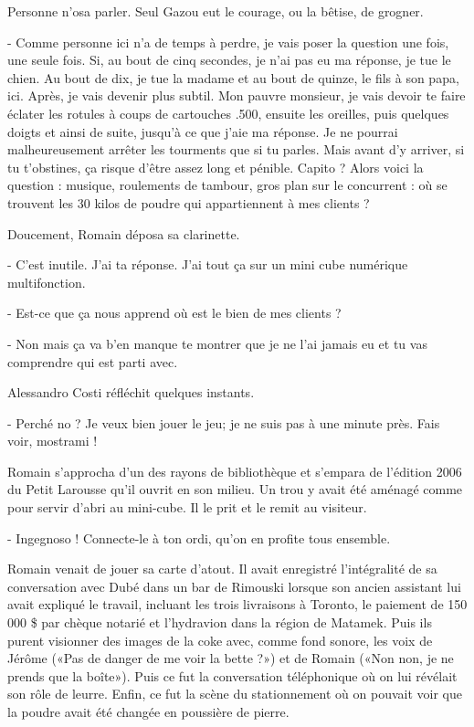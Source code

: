 Personne n’osa parler. Seul Gazou eut le courage, ou la bêtise, de grogner.

- Comme personne ici n’a de temps à perdre, je vais poser la question une fois, une seule fois. Si, au bout de cinq secondes, je n’ai pas eu ma réponse, je tue le chien. Au bout de dix, je tue la madame et au bout de quinze, le fils à son papa, ici. Après, je vais devenir plus subtil. Mon pauvre monsieur, je vais devoir te faire éclater les rotules à coups de cartouches .500, ensuite les oreilles, puis quelques doigts et ainsi de suite, jusqu’à ce que j’aie ma réponse. Je ne pourrai malheureusement arrêter les tourments que si tu parles. Mais avant d’y arriver, si tu t’obstines, ça risque d’être assez long et pénible. Capito ? Alors voici la question : musique, roulements de tambour, gros plan sur le concurrent : où se trouvent les 30 kilos de poudre qui appartiennent à mes clients ?

Doucement, Romain déposa sa clarinette.

- C’est inutile. J’ai ta réponse. J’ai tout ça sur un mini cube numérique multifonction.

- Est-ce que ça nous apprend où est le bien de mes clients ?

- Non mais ça va b’en manque te montrer que je ne l’ai jamais eu et tu vas comprendre qui est parti avec.

Alessandro Costi réfléchit quelques instants.

- Perché no ? Je veux bien jouer le jeu; je ne suis pas à une minute près. Fais voir, mostrami !

Romain s’approcha d’un des rayons de bibliothèque et s’empara de l’édition 2006 du Petit Larousse qu’il ouvrit en son milieu. Un trou y avait été aménagé comme pour servir d’abri au mini-cube. Il le prit et le remit au visiteur.

- Ingegnoso ! Connecte-le à ton ordi, qu’on en profite tous ensemble.

Romain venait de jouer sa carte d’atout. Il avait enregistré l’intégralité de sa conversation avec Dubé dans un bar de Rimouski lorsque son ancien assistant lui avait expliqué le travail, incluant les trois livraisons à Toronto, le paiement de 150 000 \$ par chèque notarié et l’hydravion dans la région de Matamek. Puis ils purent visionner des images de la coke avec, comme fond sonore, les voix de Jérôme («Pas de danger de me voir la bette ?») et de Romain («Non non, je ne prends que la boîte»). Puis ce fut la conversation téléphonique où on lui révélait son rôle de leurre. Enfin, ce fut la scène du stationnement où on pouvait voir que la poudre avait été changée en poussière de pierre.

